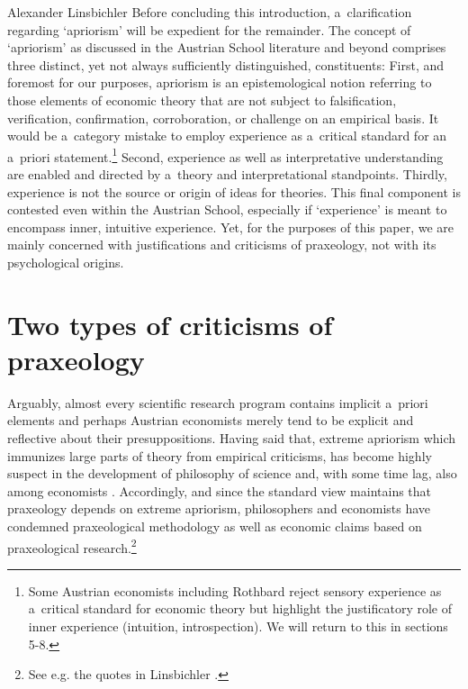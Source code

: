 \begin{artengenv}{Alexander Linsbichler}
Before concluding this introduction, a~clarification regarding ‘apriorism' will be expedient for the remainder. The concept of ‘apriorism' as discussed in the Austrian School literature and beyond comprises three distinct, yet not always sufficiently distinguished, constituents: First, and foremost for our purposes, apriorism is an epistemological notion referring to those elements of economic theory that are not subject to falsification, verification, confirmation, corroboration, or challenge on an empirical basis. It would be a~category mistake to employ experience as a~critical standard for an a~priori statement.\footnote{Some Austrian economists including Rothbard reject sensory experience as a~critical standard for economic theory but highlight the justificatory role of inner experience (intuition, introspection). We will return to this in sections 5-8.} Second, experience as well as interpretative understanding are enabled and directed by a~theory and interpretational standpoints. Thirdly, experience is not the source or origin of ideas for theories. This final component is contested even within the Austrian School, especially if ‘experience' is meant to encompass inner, intuitive experience. Yet, for the purposes of this paper, we are mainly concerned with justifications and criticisms of praxeology, not with its psychological origins.



\section{Two types of criticisms of praxeology}

Arguably, almost every scientific research program contains implicit a~priori elements and perhaps Austrian economists merely tend to be explicit and reflective about their presuppositions. Having said that, extreme apriorism which immunizes large parts of theory from empirical criticisms, has become highly suspect in the development of philosophy of science and, with some time lag, also among economists 
\parencite[][]{scheall_rise_2023}. %
 Accordingly, and since the standard view maintains that praxeology depends on extreme apriorism, philosophers and economists have condemned praxeological methodology as well as economic claims based on praxeological research.\footnote{See e.g. the quotes in Linsbichler 
\parencite*[][p.3360]{linsbichler_austrian_2021}.%
}




\end{artengenv}
